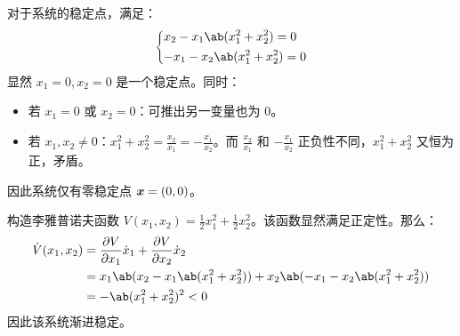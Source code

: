 \begin{problem}
    \begin{solution}
        对于系统的稳定点，满足：
        $$
        \begin{dcases}
            x_2 - x_1 \ab(x_1^2 + x_2^2) = 0 \\
            -x_1 - x_2 \ab(x_1^2 + x_2^2) = 0
        \end{dcases}
        $$
        显然 $x_1 = 0, x_2 = 0$ 是一个稳定点。同时：
        \begin{itemize}
            \item 若 $x_1 = 0$ 或 $x_2 = 0$：可推出另一变量也为 $0$。
            \item 若 $x_1, x_2 \neq 0$：$x_1^2 + x_2^2 = \frac{x_2}{x_1} = -\frac{x_1}{x_2}$。而 $\frac{x_2}{x_1}$ 和 $-\frac{x_1}{x_2}$ 正负性不同，$x_1^2 + x_2^2$ 又恒为正，矛盾。
        \end{itemize}
        因此系统仅有零稳定点 $\boldsymbol{x} = (0, 0)$。

        构造李雅普诺夫函数 $V(x_1, x_2) = \frac{1}{2} x_1^2 + \frac{1}{2} x_2^2$。该函数显然满足正定性。那么：
        $$
        \begin{aligned}
            \dot{V}(x_1, x_2) & = \pdv{V}{x_1} \dot{x}_1 + \pdv{V}{x_2} \dot{x}_2 \\
            & = x_1 \ab(x_2 - x_1 \ab(x_1^2 + x_2^2)) + x_2 \ab(-x_1 - x_2 \ab(x_1^2 + x_2^2)) \\
            & = -\ab(x_1^2 + x_2^2)^2 < 0
        \end{aligned}
        $$
        因此该系统渐进稳定。
    \end{solution}
\end{problem}